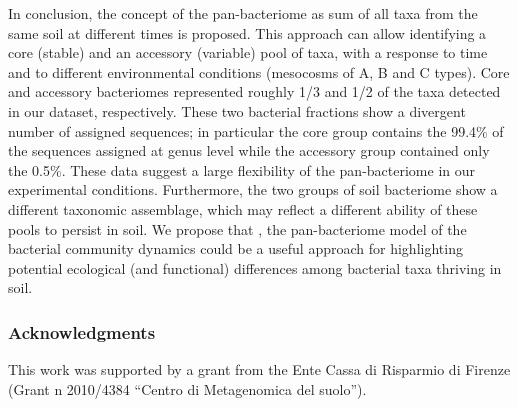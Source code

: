 In conclusion, the concept of the pan-bacteriome as sum of all taxa from the same soil at different times is proposed. This approach can allow identifying a core (stable) and an accessory (variable) pool of taxa, with a response to time and to different environmental conditions (mesocosms of A, B and C types). Core and accessory bacteriomes represented roughly 1/3 and 1/2 of the taxa detected in our dataset, respectively. These two bacterial fractions show a divergent number of assigned sequences; in particular the core group contains the 99.4\% of the sequences assigned at genus level while the accessory group contained only the 0.5\%. These data suggest a large flexibility of the pan-bacteriome in our experimental conditions. Furthermore, the two groups of soil bacteriome show a different taxonomic assemblage, which may reflect a different ability of these pools to persist in soil. We propose that , the pan-bacteriome model of the bacterial community dynamics could be a useful approach for highlighting potential ecological (and functional) differences among bacterial taxa thriving in soil.\\

\subsubsection{Acknowledgments}
This work was supported by a grant from the Ente Cassa di Risparmio di Firenze (Grant n{\textdegree} 2010/4384 ``Centro di Metagenomica del suolo''). 


\backmatter
{}
\renewcommand{\sectionmark}[1]{\markright{#1}}
\sectionmark{Bibliography}
